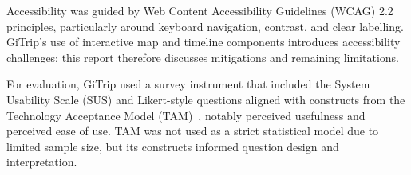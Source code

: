 Accessibility was guided by Web Content Accessibility Guidelines (WCAG) 2.2~\cite{ref_wcag22} principles, particularly
around keyboard navigation, contrast, and clear labelling. GiTrip's use of
interactive map and timeline components introduces accessibility challenges; this
report therefore discusses mitigations and remaining limitations.

For evaluation, GiTrip used a survey instrument that included the System
Usability Scale (SUS) and Likert-style questions aligned with constructs from the
Technology Acceptance Model (TAM)~\cite{ref_tam_davis}, notably perceived usefulness and perceived
ease of use. TAM was not used as a strict statistical model
due to limited sample size, but its constructs informed question design and
interpretation.
